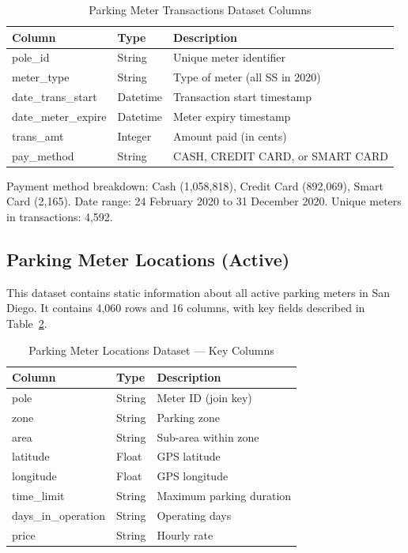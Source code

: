 \documentclass[12pt, a4paper]{article}
\begin{document}
\begin{table}[H]
\centering
\caption{Parking Meter Transactions Dataset Columns}
\label{tab:transactions}
\begin{tabular}{@{}lll@{}}
\toprule
\textbf{Column} & \textbf{Type} & \textbf{Description} \\
\midrule
pole\_id            & String   & Unique meter identifier \\
meter\_type         & String   & Type of meter (all SS in 2020) \\
date\_trans\_start  & Datetime & Transaction start timestamp \\
date\_meter\_expire & Datetime & Meter expiry timestamp \\
trans\_amt          & Integer  & Amount paid (in cents) \\
pay\_method         & String   & CASH, CREDIT CARD, or SMART CARD \\
\bottomrule
\end{tabular}
\end{table}

Payment method breakdown: Cash (1,058,818), Credit Card (892,069),
Smart Card (2,165). Date range: 24 February 2020 to 31 December 2020.
Unique meters in transactions: 4,592.

\subsection{Parking Meter Locations (Active)}
This dataset contains static information about all active parking meters
in San Diego. It contains 4,060 rows and 16 columns, with key fields
described in Table~\ref{tab:locations}.

\begin{table}[H]
\centering
\caption{Parking Meter Locations Dataset --- Key Columns}
\label{tab:locations}
\begin{tabular}{@{}lll@{}}
\toprule
\textbf{Column} & \textbf{Type} & \textbf{Description} \\
\midrule
pole                & String  & Meter ID (join key) \\
zone                & String  & Parking zone \\
area                & String  & Sub-area within zone \\
latitude            & Float   & GPS latitude \\
longitude           & Float   & GPS longitude \\
time\_limit         & String  & Maximum parking duration \\
days\_in\_operation & String  & Operating days \\
price               & String  & Hourly rate \\
\bottomrule
\end{tabular}
\end{table}
\end{document}
